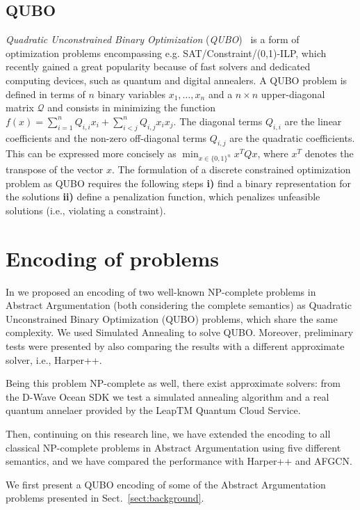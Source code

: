 \documentclass[conference]{IEEEtran}
\begin{document}
\subsection{QUBO}\label{sect:qubo}
\emph{Quadratic Unconstrained Binary Optimization} (\emph{QUBO})~\cite{glover,glover2} is a
form of optimization problems encompassing e.g. SAT/Constraint/(0,1)-ILP, which  recently gained a great popularity because of fast solvers and dedicated computing devices, such as
quantum and digital annealers. 
A QUBO problem is defined in terms of $n$ binary variables $x_1,\dots,x_n$
and a $n\times n$ upper-diagonal matrix $\mathcal{Q}$ and consists in 
minimizing the function $f(x) = \sum_{i=1}^n Q_{i,i} x_i + \sum_{i < j}^n Q_{i,j} x_i x_j$.
The diagonal terms $Q_{i,i}$ are the linear coefficients and the non-zero off-diagonal terms $Q_{i,j}$
are the quadratic coefficients. This can be expressed more concisely as $\min_{x \in \{0,1\}^n} x^T Q x$, where $x^T$ denotes the transpose of the vector $x$. The formulation of a discrete constrained optimization problem as QUBO requires
the following steps {\bf i)}  find a binary representation for the solutions {\bf ii)}  define a penalization function, which penalizes unfeasible solutions (i.e., violating a constraint).

\section{Encoding of problems}\label{sect:encoding}
In \cite{pricai22} we proposed an encoding of two well-known NP-complete problems in Abstract Argumentation (both considering the complete semantics) as Quadratic Unconstrained Binary Optimization (QUBO) problems, which share the same complexity.  We used Simulated Annealing  to solve QUBO. Moreover, preliminary tests were presented by also comparing the results with a different approximate solver, i.e., Harper++. 

 Being this problem NP-complete as well, there exist approximate solvers: from the D-Wave Ocean SDK we test a simulated annealing algorithm and a real quantum annelaer provided by the LeapTM Quantum Cloud Service.

Then, continuing on this research line, we have extended the encoding to all classical NP-complete problems in Abstract Argumentation using five different semantics, and we have  compared the performance with Harper++ and AFGCN. 


We first present a QUBO encoding of some of the Abstract Argumentation problems presented in Sect.~\ref{sect:background}. 
\end{document}
